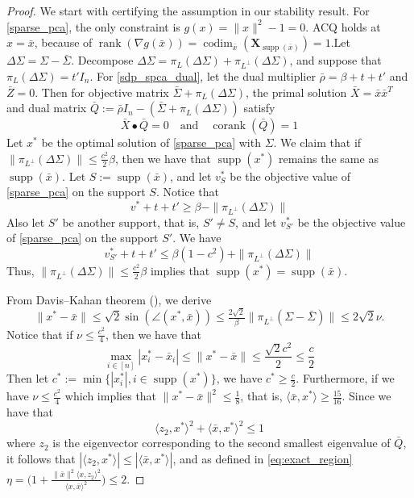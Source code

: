 \documentclass[11pt]{amsart}
\theoremstyle{plain}
\theoremstyle{definition}
\theoremstyle{remark}
\newcommand{\vX}{{\mathbf{X}}}
\DeclareMathOperator{\rank}{rank}
\DeclareMathOperator{\corank}{corank}
\DeclareMathOperator{\codim}{codim}
\DeclareMathOperator{\supp}{supp}
\begin{document}
	\begin{proof}
		We start with certifying the assumption in our stability result.  
		For \eqref{sparse_pca}, the only constraint is $g(x) = \|x\|^2-1 = 0$. ACQ holds at $x = \bar x$, because of $\rank(\nabla g(\bar x))  = \codim_{\bar x} (\vX_{\supp(\bar x)}) = 1$.Let \(\Delta \Sigma = \Sigma - \bar\Sigma \).  Decompose \(\Delta \Sigma =  \pi_{L}(\Delta\Sigma)+  \pi_{L^\perp}(\Delta\Sigma) \), and suppose that \( \pi_{L}(\Delta\Sigma) = t'I_n\). For \eqref{sdp_spca_dual}, let the dual multiplier $\bar \rho = \beta+t+t'$ and $\bar Z=0$. Then for objective matrix $\bar \Sigma + \pi_{L}(\Delta\Sigma)$, the primal solution $\bar X = \bar x\bar x^T$ and dual matrix $\bar Q:= \bar \rho I_n - (\bar\Sigma + \pi_{L}(\Delta\Sigma))$ satisfy 
		\[
		\bar X \bullet \bar Q = 0 \quad \text{and}\quad \corank(\bar Q)=1
		\]
		Let \(x^*\) be the optimal solution of \eqref{sparse_pca} with \(\Sigma\). We claim that if \(\|\pi_{L^\perp}(\Delta\Sigma)\|\leq \tfrac{c^2}{2}\beta\), then we have that \(\supp(x^*)\) remains the same as \(\supp(\bar x)\). Let \(S := \supp(\bar x)\), and let \(v^*_S\) be the objective value of \eqref{sparse_pca} on the support \(S\).  Notice that
		\[
		v^* + t + t'  \geq \beta - \|\pi_{L^\perp}(\Delta\Sigma)\|
		\]
		Also let \(S'\) be another support, that is, \(S' \neq S\), and let \(v^*_{S'}\) be the objective value of \eqref{sparse_pca} on the support \(S'\). We have
		\[
		v^*_{S'} + t  +t' \leq \beta(1-c^2) + \|\pi_{L^\perp}(\Delta\Sigma)\|
		\]
		Thus,  \(\|\pi_{L^\perp}(\Delta\Sigma)\|\leq \tfrac{c^2}{2}\beta\) implies that \(\supp(x^*)=\supp(\bar x)\). 
		
		From Davis–Kahan theorem (\cite{yu2015useful}), we derive  
		\[
		\|x^* - \bar x\| \leq \sqrt{2}\sin(\angle(x^*,\bar x))\leq\tfrac{2 \sqrt{2}}{\beta}\|\pi_{L^\perp}( \Sigma - \bar \Sigma)\| \leq 2\sqrt{2}\nu.
		\]
		Notice that if \(\nu\leq\tfrac{c^2}{4}\), then we have that
		\[
		\max_{i\in [n]} |x^*_i - \bar x_i| \leq \|x^* - \bar x\| \leq\frac{\sqrt{2}c^2}{2}\leq \frac{c}{2}
		\]
		Then let \(c^*:= \min\{|x^*_i|,i\in\supp(x^*)\}\), we have \(c^*\geq \tfrac{c}{2}\). Furthermore, if we have \(\nu\leq\tfrac{c^2}{4}\) which implies that 
		\(\|x^* - \bar x\|^2 \leq \tfrac{1}{8}\),
		that is, \(\langle\bar x, x^*\rangle \geq \tfrac{15}{16}\). Since we have that
		\[
		\langle z_2, x^*\rangle^2 +  \langle\bar x, x^*\rangle^2 \leq 1
		\]
		where \(z_2\) is the eigenvector corresponding to the second smallest eigenvalue of \(\bar Q\), it follows that \(|\langle z_2, x^*\rangle|\leq |\langle\bar x, x^*\rangle|\), and as defined in \eqref{eq:exact_region} \(\eta = \big(1 + \frac{\|\bar x\|^2\langle  x,z_2\rangle^2}{\langle x, \bar x\rangle^2}\big) \leq 2\).
		

\end{proof}
\end{document}
